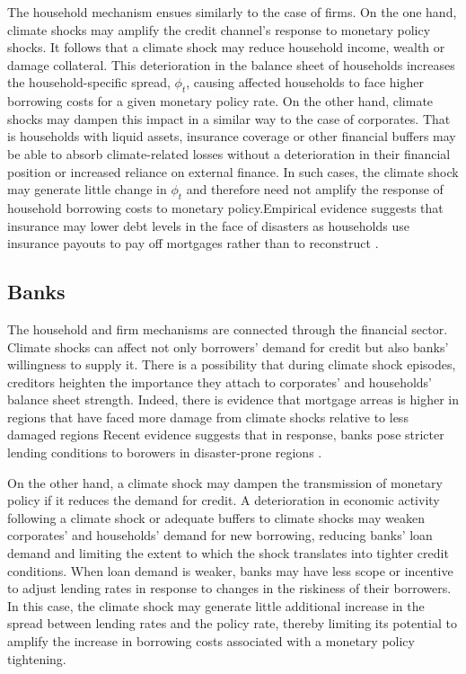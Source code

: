 \documentclass[
  letterpaper,
  DIV=11,
  numbers=noendperiod]{scrartcl}
\begin{document}
The household mechanism ensues similarly to the case of firms. On the
one hand, climate shocks may amplify the credit channel's response to
monetary policy shocks. It follows that a climate shock may reduce
household income, wealth or damage collateral. This deterioration in the
balance sheet of households increases the household-specific spread,
\(\phi_{t}\), causing affected households to face higher borrowing costs
for a given monetary policy rate. On the other hand, climate shocks may
dampen this impact in a similar way to the case of corporates. That is
households with liquid assets, insurance coverage or other financial
buffers may be able to absorb climate-related losses without a
deterioration in their financial position or increased reliance on
external finance. In such cases, the climate shock may generate little
change in \(\phi_{t}\) and therefore need not amplify the response of
household borrowing costs to monetary policy.Empirical evidence suggests
that insurance may lower debt levels in the face of disasters as
households use insurance payouts to pay off mortgages rather than to
reconstruct \citep{Household2017}.

\subsection{Banks}\label{banks}

The household and firm mechanisms are connected through the financial
sector. Climate shocks can affect not only borrowers' demand for credit
but also banks' willingness to supply it. There is a possibility that
during climate shock episodes, creditors heighten the importance they
attach to corporates' and households' balance sheet strength. Indeed,
there is evidence that mortgage arreas is higher in regions that have
faced more damage from climate shocks relative to less damaged regions
\citep{HO2023102790} Recent evidence suggests that in response, banks
pose stricter lending conditions to borowers in disaster-prone regions
\citep{Duanmu02012022}.

On the other hand, a climate shock may dampen the transmission of
monetary policy if it reduces the demand for credit. A deterioration in
economic activity following a climate shock or adequate buffers to
climate shocks may weaken corporates' and households' demand for new
borrowing, reducing banks' loan demand and limiting the extent to which
the shock translates into tighter credit conditions. When loan demand is
weaker, banks may have less scope or incentive to adjust lending rates
in response to changes in the riskiness of their borrowers. In this
case, the climate shock may generate little additional increase in the
spread between lending rates and the policy rate, thereby limiting its
potential to amplify the increase in borrowing costs associated with a
monetary policy tightening.
\end{document}
